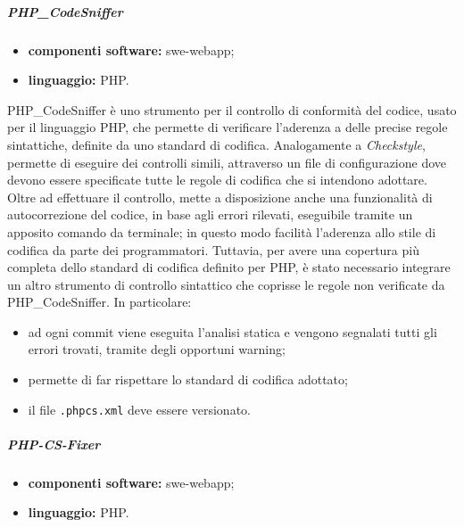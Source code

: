 				\subparagraph{PHP\_CodeSniffer} 
				
					\begin{itemize}
						\item \textbf{componenti software:} swe-webapp;
						\item \textbf{linguaggio:} PHP.
					\end{itemize}
					
					PHP\_CodeSniffer è uno strumento per il controllo di conformità del codice, usato per il linguaggio PHP, che permette di verificare l'aderenza a delle precise regole sintattiche, definite da uno standard di codifica.
					\newline
					Analogamente a \textit{Checkstyle}, permette di eseguire dei controlli simili, attraverso un file di configurazione dove devono essere specificate tutte le regole di codifica che si intendono adottare.
					\newline
					Oltre ad effettuare il controllo, mette a disposizione anche una funzionalità di autocorrezione del codice, in base agli errori rilevati, eseguibile tramite un apposito comando da terminale; in questo modo facilità l'aderenza allo stile di codifica da parte dei programmatori.
					\newline
					Tuttavia, per avere una copertura più completa dello standard di codifica definito per PHP, è stato necessario integrare un altro strumento di controllo sintattico che coprisse le regole non verificate da PHP\_CodeSniffer. In particolare:
					\begin{itemize}
						\item ad ogni commit viene eseguita l'analisi statica e vengono segnalati tutti gli errori trovati, tramite degli opportuni warning;
						\item permette di far rispettare lo standard di codifica adottato;
						\item il file \verb!.phpcs.xml! deve essere versionato.
					\end{itemize}
				
				\subparagraph{PHP-CS-Fixer} 
					
					\begin{itemize}
						\item \textbf{componenti software:} swe-webapp;
						\item \textbf{linguaggio:} PHP.
					\end{itemize}
					
